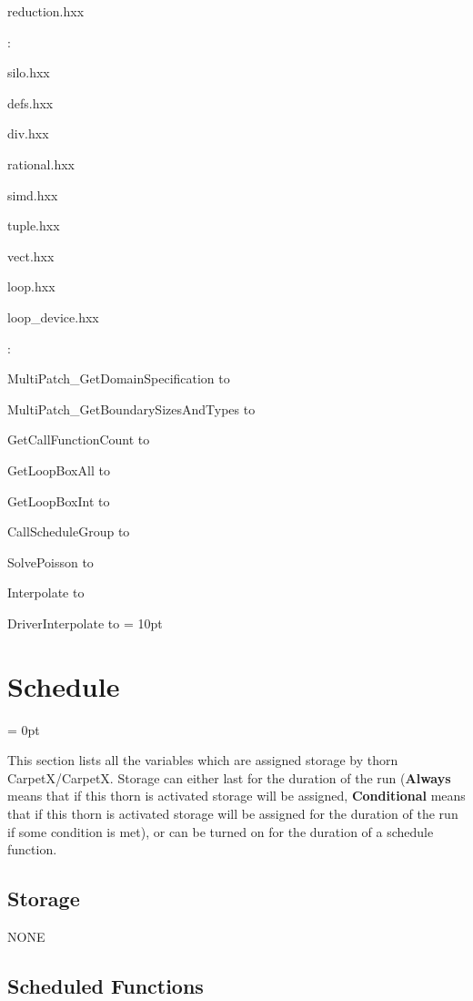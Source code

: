 reduction.hxx
\vspace{2mm}

: 

silo.hxx

defs.hxx

div.hxx

rational.hxx

simd.hxx

tuple.hxx

vect.hxx

loop.hxx

loop\_device.hxx
\vspace{2mm}

: 



MultiPatch\_GetDomainSpecification to 

MultiPatch\_GetBoundarySizesAndTypes to 

GetCallFunctionCount to 

GetLoopBoxAll to 

GetLoopBoxInt to 

CallScheduleGroup to 

SolvePoisson to 

Interpolate to 

DriverInterpolate to 
\vspace{2mm}\parskip = 10pt 

\section{Schedule} 


\parskip = 0pt


\noindent This section lists all the variables which are assigned storage by thorn CarpetX/CarpetX.  Storage can either last for the duration of the run ({\bf Always} means that if this thorn is activated storage will be assigned, {\bf Conditional} means that if this thorn is activated storage will be assigned for the duration of the run if some condition is met), or can be turned on for the duration of a schedule function.


\subsection*{Storage}NONE
\subsection*{Scheduled Functions}
\vspace{5mm}

